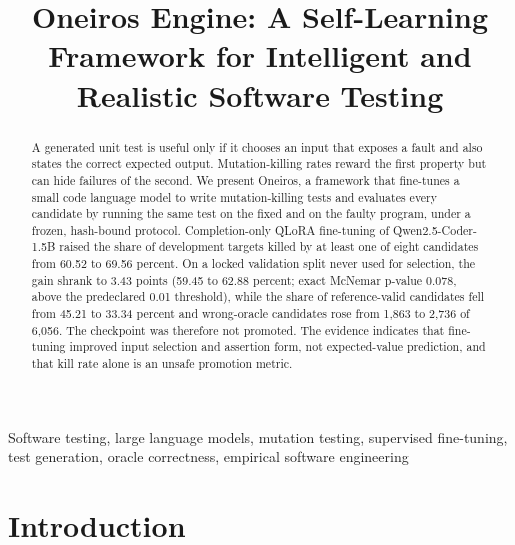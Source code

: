 \documentclass[conference,a4paper]{IEEEtran}
\newif\ifanonymous
\begin{document}
\title{Oneiros Engine: A Self-Learning Framework for Intelligent and Realistic Software Testing}

\ifanonymous
\author{\IEEEauthorblockN{Anonymous Author(s)}\IEEEauthorblockA{Affiliation withheld for double-blind review}}
\else
\author{
}
\fi

\maketitle

\begin{abstract}
A generated unit test is useful only if it chooses an input that exposes a fault
and also states the correct expected output. Mutation-killing rates reward the first
property but can hide failures of the second. We present Oneiros, a framework that
fine-tunes a small code language model to write mutation-killing tests and evaluates
every candidate by running the same test on the fixed and on the faulty program, under
a frozen, hash-bound protocol. Completion-only QLoRA fine-tuning of
Qwen2.5-Coder-1.5B raised the share of development targets killed by at least one of
eight candidates from 60.52 to 69.56 percent. On a locked validation split never used
for selection, the gain shrank to 3.43 points (59.45 to 62.88 percent; exact McNemar
p-value 0.078, above the predeclared 0.01 threshold), while the share of
reference-valid candidates fell from 45.21 to 33.34 percent and wrong-oracle candidates
rose from 1,863 to 2,736 of 6,056. The checkpoint was therefore not promoted. The
evidence indicates that fine-tuning improved input selection and assertion form, not
expected-value prediction, and that kill rate alone is an unsafe promotion metric.
\end{abstract}

\begin{IEEEkeywords}
Software testing, large language models, mutation testing, supervised fine-tuning,
test generation, oracle correctness, empirical software engineering
\end{IEEEkeywords}

\section{Introduction}
\end{document}
